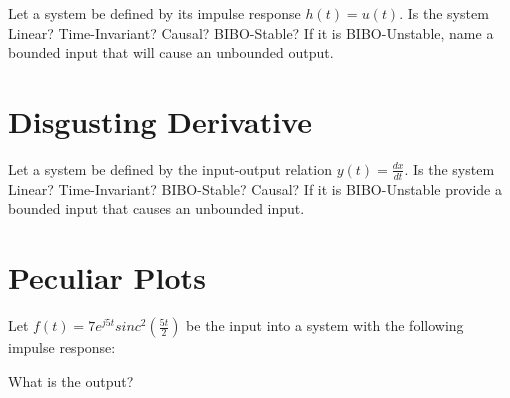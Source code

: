\documentclass{article}
\begin{document}
Let a system be defined by its impulse response $h(t) = u(t)$. Is the system Linear? Time-Invariant? Causal? BIBO-Stable? If it is BIBO-Unstable, name a bounded input that will cause an unbounded output.

\vspace{3cm}

\section{Disgusting Derivative}

Let a system be defined by the input-output relation $y(t) = \frac{dx}{dt}$. Is the system Linear? Time-Invariant? BIBO-Stable? Causal? If it is BIBO-Unstable provide a bounded input that causes an unbounded input.
\vfill

\section{Peculiar Plots}

Let $f(t) = 7e^{j5t} sinc^2(\frac{5t}{2})$ be the input into a system with the following impulse response:


\begin{figure}[h!]
    \centering
\end{figure}

What is the output?
\end{document}
